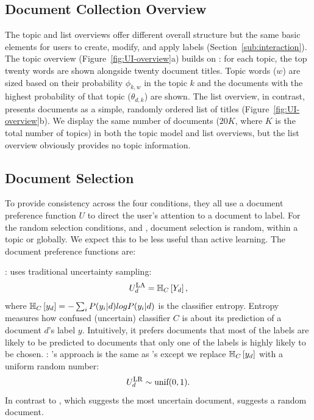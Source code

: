 \subsection{Document Collection Overview}\label{sub:UI}



The topic and list overviews offer different overall structure but the
same basic elements for users to create, modify, and apply labels
(Section~\ref{sub:interaction}). The topic overview
(Figure~\ref{fig:UI-overview}a) builds on : for each
topic, the top twenty words are shown alongside twenty document
titles. Topic words ($w$) are sized based on their probability
$\phi_{k,w}$ in the topic $k$ and the documents with the highest
probability of that topic ($\theta_{d,k}$) are shown.  The list
overview, in contrast, presents documents as a simple, randomly
ordered list of titles (Figure~\ref{fig:UI-overview}b). We
display the same number of documents ($20K$, where $K$ is the total
number of topics) in both the topic model and list overviews, but the
list overview obviously provides no topic information.

\subsection{Document Selection}\label{sub:AL}










To provide consistency across the four conditions, they all use a
document preference function $U$ to direct the user's attention to a document to label.  For the random selection
conditions,  and , document selection is random, within a topic or globally.
We expect this to be less useful than active
learning. The document preference functions are:

\noindent
\textbf{}:  uses traditional uncertainty sampling:
\begin{equation}\label{eq:AL_UA}
	U_{d}^{\mbox{\textsc{la}}} = \mathbb{H}_{C}\left[ Y_d \right],
\end{equation}
 where
$\mathbb{H}_{C}\left[ y_d \right] = -\sum_{i} P(y_i|d)log P(y_i|d)$ is the classifier entropy. Entropy measures how confused (uncertain) classifier $C$ is about its prediction of a document $d$'s label $y$. Intuitively, it prefers documents that most of the labels are likely to be predicted to documents that only one of the labels is highly likely to be chosen.
\noindent
\textbf{}: 's approach is the same as 's
except we replace $\mathbb{H}_{C}\left[ y_d \right]$ with a uniform random number:
\begin{equation}\label{eq:AL_UR}
	U_{d}^{\mbox{\textsc{lr}}} \sim \mbox{unif}(0,1).
\end{equation}
 In contrast to , which suggests the most uncertain document,  suggests a random document.

